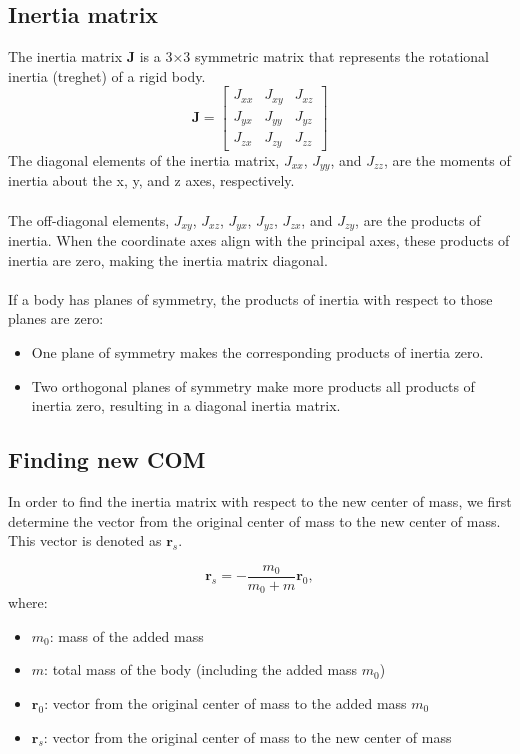 \subsection{Inertia matrix}
The inertia matrix \textbf{J} is a 3×3 symmetric matrix that represents the rotational inertia (treghet) of a rigid body. 
\[
\mathbf{J} = \begin{bmatrix}
    J_{xx} & J_{xy} & J_{xz} \\
    J_{yx} & J_{yy} & J_{yz} \\
    J_{zx} & J_{zy} & J_{zz}
\end{bmatrix}
\]
The diagonal elements of the inertia matrix, \( J_{xx} \), \( J_{yy} \), and \( J_{zz} \), are the moments of inertia about the x, y, and z axes, respectively. 
\\
\\
The off-diagonal elements, \( J_{xy} \), \( J_{xz} \), \( J_{yx} \), \( J_{yz} \), \( J_{zx} \), and \( J_{zy} \), are the products of inertia. When the coordinate axes align with the principal axes, these products of inertia are zero, making the inertia matrix diagonal.
\\
\\
If a body has planes of symmetry, the products of inertia with respect to those planes are zero:
\begin{itemize}
    \item One plane of symmetry makes the corresponding products of inertia zero.
    \item Two orthogonal planes of symmetry make more products all products of inertia zero, resulting in a diagonal inertia matrix.
\end{itemize}

\subsection{Finding new COM}

In order to find the inertia matrix with respect to the new center of mass, we first determine the vector from the original center of mass to the new center of mass. This vector is denoted as $\mathbf{r}_s$.

\begin{equation}
    \mathbf{r}_s = -\frac{m_0}{m_0 + m} \mathbf{r}_0,
\end{equation}
where: 
\begin{itemize}
    \item $m_0$: mass of the added mass
    \item $m$: total mass of the body (including the added mass $m_0$)
    \item $\mathbf{r}_0$: vector from the original center of mass to the added mass $m_0$
    \item $\mathbf{r}_s$: vector from the original center of mass to the new center of mass
\end{itemize}

